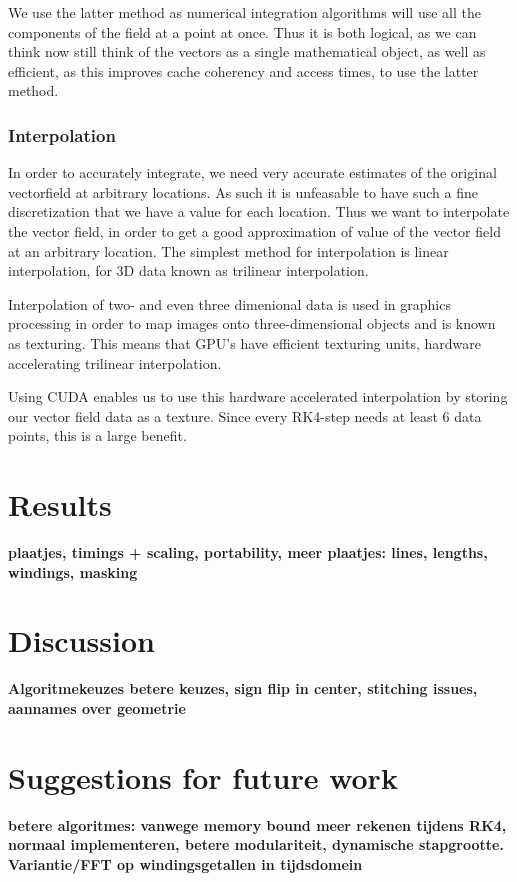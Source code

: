 \documentclass{article}
\begin{document}
We use the latter method as numerical integration algorithms will use all the components of the field at a point at once. %
Thus it is both logical, as we can think now still think of the vectors as a single mathematical object, as well as efficient, as this improves cache coherency and access times, to use the latter method.

\subsubsection{Interpolation}
In order to accurately integrate, we need very accurate estimates of the original vectorfield at arbitrary locations. As such it is unfeasable to have such a fine discretization that we have a value for each location. 
Thus we want to interpolate the vector field, in order to get a good approximation of value of the vector field at an arbitrary location. The simplest method for interpolation is linear interpolation, for 3D data known as trilinear interpolation.

Interpolation of two- and even three dimenional data is used in graphics processing in order to map images onto three-dimensional objects and is known as texturing. This means that GPU's have efficient texturing units, hardware accelerating trilinear interpolation. 

Using CUDA enables us to use this hardware accelerated interpolation by storing our vector field data as a texture. Since every RK4-step needs at least 6 data points, this is a large benefit. %
\section{Results}
{\bf plaatjes, timings + scaling, portability, meer plaatjes: lines, lengths, windings, masking}
\section{Discussion}
{\bf Algoritmekeuzes \textrightarrow betere keuzes, sign flip in center, stitching issues, aannames over geometrie}
\section{Suggestions for future work}
{\bf betere algoritmes: vanwege memory bound meer rekenen tijdens RK4, normaal implementeren, betere modulariteit, dynamische stapgrootte. Variantie/FFT op windingsgetallen in tijdsdomein}


\end{document}
